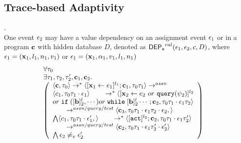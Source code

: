\subsection{ Trace-based Adaptivity}
%
%
% 
%
%
%
\begin{defn}
\label{def:event_valdep}.
\\
One event $\mathtt{\epsilon}_2$ may have a value dependency on an assignment event $\mathtt{\epsilon}_1$ or 
in a program ${\boldsymbol{\mathbf{c}}}$
with hidden database $D$, denoted as 
%
$\mathsf{DEP_{\mathtt{e}}}^{val}(\mathtt{\epsilon}_1, \mathtt{\epsilon}_2, c, D)$, where $\mathtt{\epsilon}_1 = ({\boldsymbol{\mathbf{x}}}_1, l_1, n_1, v_1) $ or 
$\mathtt{\epsilon}_1 = ({\boldsymbol{\mathbf{x}}}_1, \alpha_1, v_1, l_1, n_1)$
%
\[
\begin{array}{ll}
\begin{array}{l}
\forall \vtrace_0
\\
\exists 
\vtrace_1, \vtrace_2, \vtrace_2', \ssa{c}_1, \ssa{c}_2.
\\
  \left(
  \begin{array}{l}   
\config{\ssa{c}, \vtrace_0} \rightarrow^{*} 
\config{[\assign{\ssa{x}_1}{\expr_1}]^{l_1} ; \ssa{c}_1, \vtrace_0 \vtrace_1}  \rightarrow^{assn}
\\ 
 \config{c_1, \vtrace_0 \vtrace_1 \cdot \event_1} 
  \qquad \rightarrow^{*} 
  \config{[\assign{\ssa{x}_2}{\expr_2 ~ or ~ \query(\qexpr_2)}]^{l_2} 
  \\
  or
  \eif([\sbexpr]^l_2, \cdots) 
  or \ewhile [\sbexpr]^l_2 \cdots; \ssa{c}_2, 
  \vtrace_0 \vtrace_1 \cdot \event_1\vtrace_2} 
  \\
  \qquad \rightarrow^{assn/query/test} 
  \config{\ssa{c}_3,  \vtrace_0 \vtrace_1 \cdot \event_1 \vtrace_2 \cdot \event_2, } 
 \\ 
 \bigwedge
 \config{c_1, \vtrace_0 \vtrace_1 \cdot \event_1',} 
  \qquad \rightarrow^{*} 
  \config{[\action]^{l_2} ; \ssa{c}_2, \vtrace_0 \vtrace_1 \cdot \event_1 \vtrace_2'} 
  \\
  \qquad \rightarrow^{assn/query/test} 
  \config{\ssa{c}_2,  \vtrace_0 \vtrace_1 \cdot \event_1 \vtrace_2' \cdot \event_2'} 
\\
\bigwedge
\event_2 \neq_{v} \event_2'
\end{array}
\right)
\end{array} 
&
\end{array}
 \]
%
\end{defn}
%
